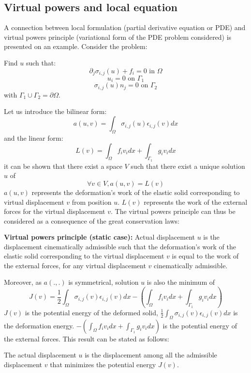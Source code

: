 \documentclass[12pt]{book}
\begin{document}
\subsection{Virtual powers and local equation}\label{sepripuiva}
A connection between local formulation (partial derivative equation or PDE)
and virtual powers principle (variational form of the PDE problem considered)
is presented on an example. Consider the problem:
\begin{prob}
Find $u$ such that:
\begin{equation}
\partial_j\sigma_{i,j}(u)+f_i=0 \mbox{ in } \Omega
\end{equation}
\begin{equation}
u_i=0 \mbox{ on } \Gamma_1
\end{equation}
\begin{equation}
\sigma_{i,j}(u)n_j=0 \mbox{ on } \Gamma_2
\end{equation}
with $\Gamma_1\cup\Gamma_2=\partial\Omega$.
\end{prob}
Let us introduce the bilinear form:
\begin{equation}
a(u,v)=\int_\Omega \sigma_{i,j}(u)\epsilon_{i,j}(v)dx
\end{equation}
and the linear form: 
\begin{equation}
L(v)=\int_\Omega
f_iv_idx+\int_{\Gamma_1}g_iv_idx
\end{equation}
it can be shown that there exist a space $V$ such that there exist a unique
solution $u$ of
\begin{equation}
\forall v\in V, a(u,v)=L(v)
\end{equation}
$a(u,v)$ represents the deformation's work of the elastic solid
corresponding to virtual displacement $v$ from position $u$.
$L(v)$ represents the work of the external forces for the virtual displacement
$v$. The virtual powers principle can thus be considered as a consequence of
the great conservation laws:
\begin{prin}{\bf Virtual powers principle (static case):}
Actual displacement $u$ is the displacement cinematically admissible such that
the deformation's work of the elastic solid corresponding to the virtual
displacement $v$ is equal to the work of the external forces, for any virtual displacement
$v$ cinematically admissible.
\end{prin}
Moreover, as $a(.,.)$ is symmetrical, solution $u$ is also the minimum of
\begin{equation}
J(v)=\frac{1}{2}\int_\Omega
\sigma_{i,j}(v)\epsilon_{i,j}(v)dx-(\int_\Omega 
f_iv_idx+\int_{\Gamma_1}g_iv_idx) 
\end{equation}
$J(v)$ is the potential energy of the deformed solid,
$\frac{1}{2}\int_\Omega \sigma_{i,j}(v)\epsilon_{i,j}(v)dx$ is the deformation
energy. $-(\int_\Omega
f_iv_idx+\int_{\Gamma_1}g_iv_idx)$ is the potential energy of the external
forces. This result \cite{ma:equad:Dautray1} can be stated
as follows:
\begin{prin}
The actual displacement $u$ is the displacement among all the admissible
displacement $v$ that minimizes the potential energy $J(v)$.
\end{prin}
\end{document}
